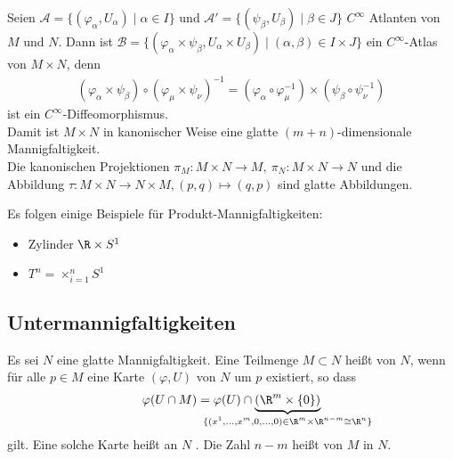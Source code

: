 Seien $\mathcal A = \{(\varphi_{\alpha}, U_{\alpha}) \mid \alpha \in I \}$ und $\mathcal A' = \{(\psi_{\beta}, U_{\beta}) \mid \beta \in J\}$ $C^{\infty}$ Atlanten von $M$ und $N$. Dann ist $\mathcal B = \{(\varphi_{\alpha}\times\psi_{\beta},U_{\alpha}\times U_{\beta}) \mid (\alpha, \beta) \in I \times J\}$ ein $C^{\infty}$-Atlas von $M\times N$, denn 
\begin{align*}
  (\varphi_{\alpha} \times \psi_{\beta}) \circ (\varphi_{\mu} \times \psi_{\nu})^{-1} = (\varphi_{\alpha} \circ \varphi_{\mu}^{-1}) \times (\psi_{\beta} \circ \psi_{\nu}^{-1})
\end{align*}
ist ein $C^{\infty}$-Diffeomorphismus.\\

Damit ist $M\times N$ in kanonischer Weise eine glatte $(m+n)$-dimensionale Mannigfaltigkeit.\\
Die kanonischen Projektionen $\pi_M\colon M\times N \to M, \ \pi_N\colon M \times N \to N$ und die Abbildung $\tau \colon M \times N \to N \times M, (p,q) \mapsto (q,p)$ sind glatte Abbildungen.

\begin{bsp}
  Es folgen einige Beispiele für Produkt-Mannigfaltigkeiten:


  \begin{itemize}
  \item Zylinder $\R \times S^1$
  \item $T^n = \times_{i=1}^nS^1$
  \end{itemize}
\end{bsp}


\subsection{Untermannigfaltigkeiten}

\begin{dfn}[Untermannigfaltigkeit]
  Es sei $N$ eine glatte Mannigfaltigkeit. Eine Teilmenge $M \subset N$ heißt  von $N$, wenn für alle $p \in M$ eine Karte $(\varphi, U)$ von $N$ um $p$ existiert, so dass
  \begin{align*}
    \varphi(U \cap M) = \varphi(U) \cap \underbrace{(\R^m \times \{0\})}_{\mathclap{\{(x^1,\ldots,x^m,0,\ldots,0) \in \R^m\times\R^{n-m} \cong \R^{n} \}}}
  \end{align*}
gilt. Eine solche Karte heißt an $N$ . Die Zahl $n-m$ heißt  von $M$ in $N$.


\end{dfn}

